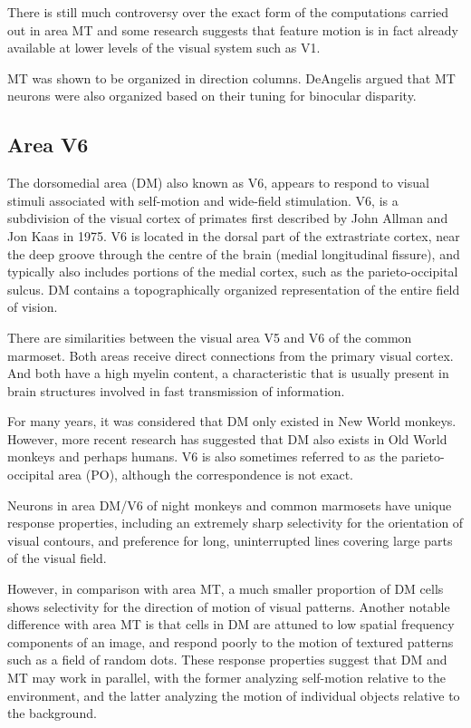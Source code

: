 There is still much controversy over the exact form of the computations carried out in area MT and some research suggests that feature motion is in fact already available at lower levels of the visual system such as V1.

MT was shown to be organized in direction columns. DeAngelis argued that MT neurons were also organized based on their tuning for binocular disparity.

\hypertarget{area-v6}{%
\subsection{Area V6}\label{area-v6}}

The dorsomedial area (DM) also known as V6, appears to respond to visual stimuli associated with self-motion and wide-field stimulation. V6, is a subdivision of the visual cortex of primates first described by John Allman and Jon Kaas in 1975. V6 is located in the dorsal part of the extrastriate cortex, near the deep groove through the centre of the brain (medial longitudinal fissure), and typically also includes portions of the medial cortex, such as the parieto-occipital sulcus. DM contains a topographically organized representation of the entire field of vision.

There are similarities between the visual area V5 and V6 of the common marmoset. Both areas receive direct connections from the primary visual cortex. And both have a high myelin content, a characteristic that is usually present in brain structures involved in fast transmission of information.

For many years, it was considered that DM only existed in New World monkeys. However, more recent research has suggested that DM also exists in Old World monkeys and perhaps humans. V6 is also sometimes referred to as the parieto-occipital area (PO), although the correspondence is not exact.

Neurons in area DM/V6 of night monkeys and common marmosets have unique response properties, including an extremely sharp selectivity for the orientation of visual contours, and preference for long, uninterrupted lines covering large parts of the visual field.

However, in comparison with area MT, a much smaller proportion of DM cells shows selectivity for the direction of motion of visual patterns. Another notable difference with area MT is that cells in DM are attuned to low spatial frequency components of an image, and respond poorly to the motion of textured patterns such as a field of random dots. These response properties suggest that DM and MT may work in parallel, with the former analyzing self-motion relative to the environment, and the latter analyzing the motion of individual objects relative to the background.

